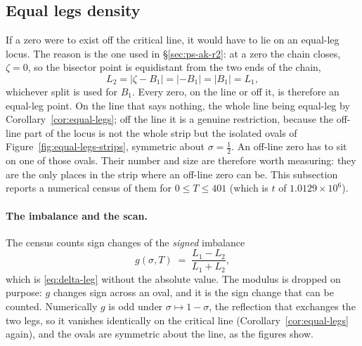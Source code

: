 \documentclass[11pt]{article}
\theoremstyle{definition}
\begin{document}
\subsection{Equal legs density}\label{sec:eqleg-density}

If a zero were to exist off the critical line, it would have to lie on an
equal-leg locus. The reason is the one used in \S\ref{sec:ps-ak-r2}: at a zero
the chain closes, $\zeta=0$, so the bisector point is equidistant from the two
ends of the chain,
\[
L_2=|\zeta-B_1|=|{-B_1}|=|B_1|=L_1 ,
\]
whichever split is used for $B_1$. Every zero, on the line or off it, is
therefore an equal-leg point. On the line that says nothing, the whole line
being equal-leg by Corollary~\ref{cor:equal-legs}; off the line it is a genuine
restriction, because the off-line part of the locus is not the whole strip but
the isolated ovals of Figure~\ref{fig:equal-legs-strips}, symmetric about
$\sigma=\tfrac12$. An off-line zero has to sit on one of those ovals. Their
number and size are therefore worth measuring: they are the only places in the
strip where an off-line zero can be. This subsection reports a numerical census
of them for $0\le T\le401$ (which is $t$ of $1.0129\times10^{6}$).

\paragraph{The imbalance and the scan.} The census counts sign changes of the
\emph{signed} imbalance
\begin{equation}\label{eq:g-imbalance}
g(\sigma,T)\;=\;\frac{L_1-L_2}{L_1+L_2},
\end{equation}
which is \eqref{eq:delta-leg} without the absolute value. The modulus is dropped
on purpose: $g$ changes sign across an oval, and it is the sign change that can
be counted. Numerically $g$ is odd under $\sigma\mapsto1-\sigma$, the reflection
that exchanges the two legs, so it vanishes identically on the critical line
(Corollary~\ref{cor:equal-legs} again), and the ovals are symmetric about the
line, as the figures show.
\end{document}
